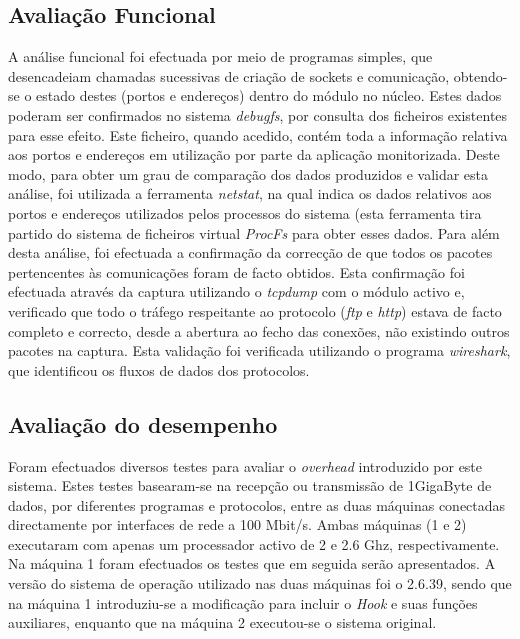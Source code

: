 \documentclass[a4paper]{llncs}
\newcommand{\td}[1]{\todo[inline]{#1}}
\begin{document}
\subsection{Avaliação Funcional}
A análise funcional foi efectuada por meio de programas simples, que desencadeiam chamadas sucessivas de criação de sockets e comunicação, obtendo-se o estado destes (portos e endereços) dentro do módulo no núcleo.
 Estes dados poderam ser confirmados no sistema \textit{debugfs}, por consulta dos ficheiros existentes para esse efeito. Este ficheiro, quando acedido, contém toda a informação relativa aos portos e endereços em utilização por parte da aplicação monitorizada.
 Deste modo, para obter um grau de comparação dos dados produzidos e validar esta análise, foi utilizada a ferramenta \textit{netstat}, na qual indica os dados relativos aos portos e endereços utilizados pelos processos do sistema (esta ferramenta tira partido do sistema de ficheiros virtual \textit{ProcFs} para obter esses dados.
 Para além desta análise, foi efectuada a confirmação da correcção de que todos os pacotes pertencentes às comunicações foram de facto obtidos.
 Esta confirmação foi efectuada através da captura utilizando o \textit{tcpdump} com o módulo activo e, verificado que todo o tráfego respeitante ao protocolo (\textit{ftp} e \textit{http}) estava de facto completo e correcto, desde a abertura ao fecho das conexões, não existindo outros pacotes na captura.
 Esta validação foi verificada utilizando o programa \textit{wireshark}, que identificou os fluxos de dados dos protocolos.

\subsection{Avaliação do desempenho}
Foram efectuados diversos testes para avaliar o \emph{overhead} introduzido por este sistema.
 Estes testes basearam-se na recepção ou transmissão de 1GigaByte de dados, por diferentes programas e protocolos, entre as duas máquinas conectadas directamente por interfaces de rede a 100 Mbit/s.
 Ambas máquinas (1 e 2) executaram com apenas um processador activo de 2 e 2.6 Ghz, respectivamente.
 Na máquina 1 foram efectuados os testes que em seguida serão apresentados.
 A versão do sistema de operação utilizado nas duas máquinas foi o 2.6.39, sendo que na máquina 1 introduziu-se a modificação para incluir o \textit{Hook} e suas funções auxiliares, enquanto que na máquina 2 executou-se o sistema original.
\end{document}
